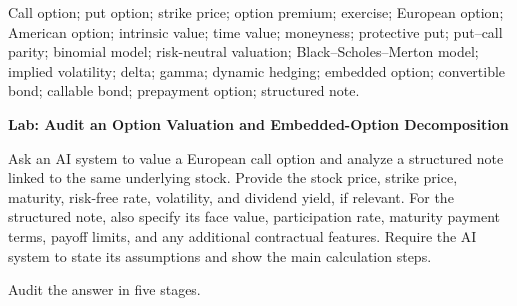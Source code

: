 

Call option; put option; strike price; option premium; exercise;
European option; American option; intrinsic value; time value; moneyness;
protective put; put--call parity; binomial model; risk-neutral valuation;
Black--Scholes--Merton model; implied volatility; delta; gamma;
dynamic hedging; embedded option; convertible bond; callable bond;
prepayment option; structured note.





\textbf{Lab: Audit an Option Valuation and Embedded-Option Decomposition}

Ask an AI system to value a European call option and analyze
a structured note linked to the same underlying stock.
Provide the stock price, strike price, maturity, risk-free
rate, volatility, and dividend yield, if relevant. For the
structured note, also specify its face value, participation
rate, maturity payment terms, payoff limits, and any
additional contractual features. Require the AI system
to state its assumptions and show the main calculation
steps.

Audit the answer in five stages.

